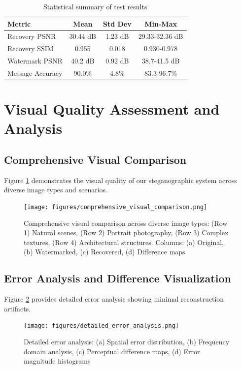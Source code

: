 \documentclass[12pt,a4paper]{report}
\begin{document}
\begin{table}[H]
    \centering
    \caption{Statistical summary of test results}
    \label{tab:statistical_summary}
    \begin{tabular}{@{}lccc@{}}
        \toprule
        Metric & Mean & Std Dev & Min-Max \\
        \midrule
        Recovery PSNR & 30.44 dB & 1.23 dB & 29.33-32.36 dB \\
        Recovery SSIM & 0.955 & 0.018 & 0.930-0.978 \\
        Watermark PSNR & 40.2 dB & 0.92 dB & 38.7-41.5 dB \\
        Message Accuracy & 90.0\% & 4.8\% & 83.3-96.7\% \\
        \bottomrule
    \end{tabular}
\end{table}

\section{Visual Quality Assessment and Analysis}

\subsection{Comprehensive Visual Comparison}

Figure \ref{fig:comprehensive_visual_comparison} demonstrates the visual quality of our steganographic system across diverse image types and scenarios.

\begin{figure}[H]
    \centering
    \texttt{[image: figures/comprehensive\_visual\_comparison.png]}
    \caption{Comprehensive visual comparison across diverse image types: (Row 1) Natural scenes, (Row 2) Portrait photography, (Row 3) Complex textures, (Row 4) Architectural structures. Columns: (a) Original, (b) Watermarked, (c) Recovered, (d) Difference maps}
    \label{fig:comprehensive_visual_comparison}
\end{figure}

\subsection{Error Analysis and Difference Visualization}

Figure \ref{fig:detailed_error_analysis} provides detailed error analysis showing minimal reconstruction artifacts.

\begin{figure}[H]
    \centering
    \texttt{[image: figures/detailed\_error\_analysis.png]}
    \caption{Detailed error analysis: (a) Spatial error distribution, (b) Frequency domain analysis, (c) Perceptual difference maps, (d) Error magnitude histograms}
    \label{fig:detailed_error_analysis}
\end{figure}
\end{document}

